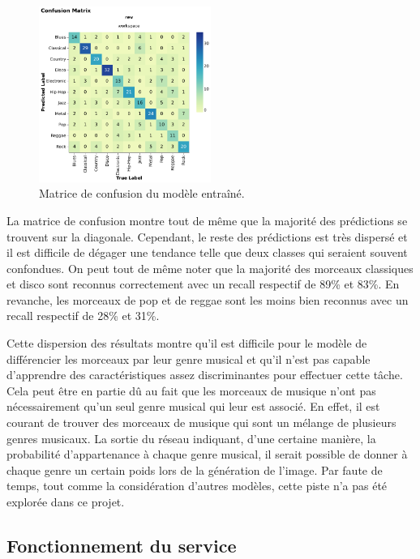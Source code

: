 \begin{figure}[H]
    \centering
    \includegraphics[width=0.5\textwidth]{rsc/confusion_matrix.pdf}
    \caption{Matrice de confusion du modèle entraîné.}
    \label{fig:confusion_matrix}
\end{figure}

La matrice de confusion montre tout de même que la majorité des prédictions se trouvent sur la diagonale. Cependant, le reste des prédictions est très dispersé et il est difficile de dégager une tendance telle que deux classes qui seraient souvent confondues. On peut tout de même noter que la majorité des morceaux classiques et disco sont reconnus correctement avec un recall respectif de 89\% et 83\%. En revanche, les morceaux de pop et de reggae sont les moins bien reconnus avec un recall respectif de 28\% et 31\%. 

Cette dispersion des résultats montre qu'il est difficile pour le modèle de différencier les morceaux par leur genre musical et qu'il n'est pas capable d'apprendre des caractéristiques assez discriminantes pour effectuer cette tâche. Cela peut être en partie dû au fait que les morceaux de musique n'ont pas nécessairement qu'un seul genre musical qui leur est associé. En effet, il est courant de trouver des morceaux de musique qui sont un mélange de plusieurs genres musicaux. La sortie du réseau indiquant, d'une certaine manière, la probabilité d'appartenance à chaque genre musical, il serait possible de donner à chaque genre un certain poids lors de la génération de l'image. Par faute de temps, tout comme la considération d'autres modèles, cette piste n'a pas été explorée dans ce projet.

\subsection{Fonctionnement du service}

